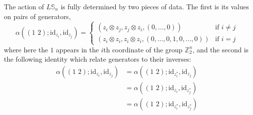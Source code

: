 \documentclass{amsbook} %
\newcommand{\id}{\textrm{id}}
\newcommand{\trans}[2]{( #1 \, \, #2 )}
\numberwithin{section}{chapter}
\begin{document}
\begin{prop} The action of $L\mathbb{S}_n$ is fully determined by two pieces of data. The first is its values on pairs of generators,
  \[
    \alpha\left(\trans{1}{2};\id_{z_i}, \id_{z_j}\right) =
      \begin{cases}
  			\left(z_i \otimes z_j, z_j \otimes z_i, (0, \ldots, 0) \right) & \text{if } i \neq j \\
  			\left(z_i \otimes z_i, z_i \otimes z_i, (0,\ldots,0, 1, 0,\ldots,0) \right) & \text{if } i = j
  		\end{cases} 
  \]
where here the $1$ appears in the $i$th coordinate of the group $\mathbb{Z}_2^{n}$, and the second is the following identity which relate generators to their inverses:
  \begin{align*} 
  			\alpha\left(\trans{1}{2} ;\id_{z_i}, \id_{z_j}\right) &= \alpha\left(\trans{1}{2};\id_{z_i^*}, \id_{z_j}\right) \\
  			&= \alpha\left(\trans{1}{2} ; \id_{z_i}, \id_{z_j^*} \right) \\
  			&= \alpha\left( \trans{1}{2}  ;  \id_{z_i^*}, \id_{z_j^*}  \right)
  		\end{align*}
\end{prop}
\end{document}
